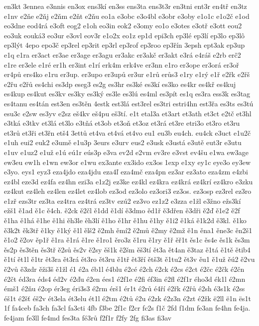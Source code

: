 {en3kt
3ennea
e3nnis
en3ox
ens3kí
en3ss
ens3ta
ens3t3r
en3tni
ent3r
en4tř
en3tz
e1nv
e2ňe
e2ňj
e2ňm
e2ňt
e2ňu
eo1a
e3obc
e3o4bl
e3obr
e3oby
e1o1c
e1o2č
e1od
eo3dne
eod4rá
e3oft
eog2
e1oh
eo3in
eok2
e3omy
eo1o
e3otes
e3otř
e3ott
eou2
eo3uk
eouká3
eo3ur
e3ovl
eov3r
e1o2x
eo1z
ep1d
epi3ch
ep3lé
ep3lí
ep3lo
ep3lô
ep3lýt
4epo
epo3č
ep3rel
ep3rit
ep3rl
ep3rof
ep3roo
ep3řín
3epsh
ept3ak
ep3up
e1q
e1ra
er3act
er3ae
er3age
er3agu
er3akc
er3akč
er3akt
e3rá
e4ráš
e2rb
erč2
e1re
er3ele
e1ré
er1h
er3int
e1rí
erk4m
erk4ve
er3nn
e1ro
er3ope
er3orá
er3oř
er4pů
ers4ko
e1ru
er3up.
er3upo
er3upů
er3ur
e1rů
erůs3
e1ry
e1rý
e1ř
e2řk
e2řš
e2řu
e2řů
es4chi
es3dp
eseg3
es2g
es3hr
es3ké
es3kí
es3ko
es4kr
es4kř
es4kuj
es4kup
es4kut
es3kv
es3ky
es3ký
es3le
es3lú
es4ml
es3pít
es1q
es3ra
ess3k
es3tag
es4tanu
es4tán
est3en
es3těn
4estk
est3lá
est3rel
es3tri
estri4hn
est3řa
es3ts
es3tú
esu3c
e2sw
es3yv
e2sz
eš4kv
eš4pu
eš3tí.
e1t
etal3a
et3art
et3ath
et3ct
e2tč
et3hl
e3tká
e3tkv
et3lá
et3lo
e3tňá
et3ob
et3oň
et3oz
et3rá
et3re
etri3o
et3ro
et3ru
et3rů
et3ři
et3řn
etš4
3ettů
et4va
et4vá
et4vo
eu1
eu3b
eu4ch.
eu4ck
e3uct
e1u2č
e1uh
eui2
euk2
e3umě
e1u3p
3eurs
e3urv
eus2
e3usk
e3ustá
e3utě
eut3r
e3utu
e1uv
e1uz2
e1už
e1ú
eú1r
eús3p
e3va
ev2d
e2vm
ev3re
e3vst
ev4šu
e1wa
ew3age
ew3eu
ew1h
e1wn
ew3or
e1wu
ex3ante
ex3ido
ex3os
1exp
e1xy
ey1c
eye3o
ey3ew
e3yo.
eys1
eyz3
eza4jdo
eza4jdu
eza4ľ
eza4mč
eza4pn
ez3ar
ez3ato
eza4zm
e4zbi
ez4bl
eze3d
ez4fa
ez4hn
ezi3a
e1z2j
ez3ke
ez4kl
ez4kra
ez4krá
ez4krí
ez4kro
e3zku
ez4kut
ez4leh
ez4len
ez4let
ez4lob
ez3od
ez3olo
ez3ori3
ez3os.
ez3osp
ez3rel
ez3ro
e1zř
ezs3tr
ez3ta
ez4tra
ez4trá
ez3tv
ezú2
ez3vo
ez1z2
e3zza
e1žl
e3žno
ežs3kí
ežš1
ě1ad
ě1c
ě4ch.
ě2ck
ě2čl
ě1dd
ě1dí
ě3dmo
ěd1ř
ě3dřen
ě3dři
ě2ď
ě1e2
ě2f
ě1ha
ě1há
ě1he
ě1hi
ěh3le
ěh3lí
ě1ho
ě1hr
ě1hu
ě1hy
ě1i2
ě1ká
ě1k2d
ě3kl.
ě1ko
ě3k2t
ěk3tř
ě1ky
ě1ký
ě1l
ělš2
ě2mh
ěmí2
ě2mů
ě2my
ě2mž
ě1n
ěna1
ěne3c
ěn2š1
ě1o2
ě2ov
ěp1ř
ě1ra
ě1rá
ě1re
ě1ro1
ěro3z
ě1ru
ě1ry
ě1ř
ěř1t
ěs1c
ěs4e
ěs1k
ěs3m
ěs2p
ěs3těn
ěs3tř
ě2sů
ěs2v
ě2sy
ěš1k
ě2šm
ěš3tí
ět3a
ět4an
ě3taz
ě1tá
ě1tě
ětib4
ě1tí
ět1l
ě1tr
ět3ra
ět3rá
ět3ro
ět3ru
ě1tř
ět3ří
ětš3t
ě1tu2
ět3v
ěu1
ě1už
ěú2
ě2vu
ě2vů
ě3zdr
ěži3š
ě1žl
é1
é2a
éb1l
é4blu
é2cé
é2ch
é2ck
é2cs
é2ct
é2čc
é2čk
é2čn
é2čt
éd3ra
éds4
éd2v
é2ďu
é2en
ées1
é2f1e
é2fi
éf3in
é2fl
é2f1r
ého3d
ék1l
é2mn
émš1
é2ňu
é2op
ér3eg
éri3s3
é2rm
érš1
ér1t
é2rů
é4ří
é2řk
é2řů
é2sh
é3s1k
é2ss
éš1t
é2šť
éš2v
ét3ela
ét3elu
ét1l
é2tm
é2tů
é2u
é2zk
é2z3n
é2zt
é2žk
ë2ll
ë1n
ës1t
1f
fa4ceb
fa3ch
fa3cl
fa3cti
4fb
f3be
2f1c
f2cr
fc2s
f1č
2fd
f1dm
fe3an
fe4hn
fe4ja.
fe4jam
fe3ll
fe4md
fes3ta
fé3rů
f2f1r
f2fy
2fg
fi3as
fi3av
}
